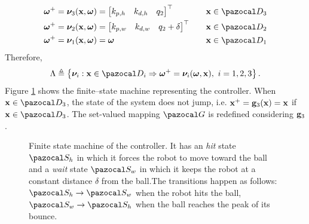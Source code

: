 %
\begin{align*}
\bm\omega^+ = \bm\nu_{3}(\xb,\bm\omega) &=\begin{bmatrix}k_{p,h}&k_{d,h}&q_2\end{bmatrix}^\top &\quad&\xb\in\D_3\\
\bm\omega^+ = \bm\nu_{2}(\xb,\bm\omega) &=\begin{bmatrix}k_{p,w}&k_{d,w}&q_2 + \delta\end{bmatrix}^\top &\quad&\xb\in\D_2\\
\bm\omega^+ = \bm\nu_{1}(\xb,\bm\omega) &= \bm\omega &\quad&\xb\in\D_1
\end{align*}
%
Therefore,
%
\begin{equation}
    \Lambda \triangleq \left\{{\bm\nu}_i:\xb\in\D_i\Rightarrow \bm\omega^+ = \bm\nu_i(\bm\omega,\xb),~ i = 1,2,3\right\}.
\end{equation}
%
Figure \ref{fig:ctrl} shows the finite--state machine representing the controller.
When $\xb\in\D_3$, the state of the system does not jump, i.e. $\mathbf{x}^+ = \mathbf{g}_3(\mathbf{x})= \mathbf{x}$ if $\xb\in\D_3$.
The set-valued mapping $\G$ is redefined considering $\mathbf{g}_3$.
%
\begin{figure}[!ht]
	\centering
	\caption{Finite state machine of the controller. It has an \textit{hit} state $\Sa_h$ in which it forces the robot to move toward the ball and a \textit{wait} state $\Sa_w$ in which it keeps the robot at a constant distance $\delta$ from the ball.The transitions happen as follows: $\Sa_h\rightarrow\Sa_w$ when the robot hits the ball, $\Sa_w\rightarrow\Sa_h$ when the ball reaches the peak of its bounce.}
	\label{fig:ctrl}
\end{figure}
